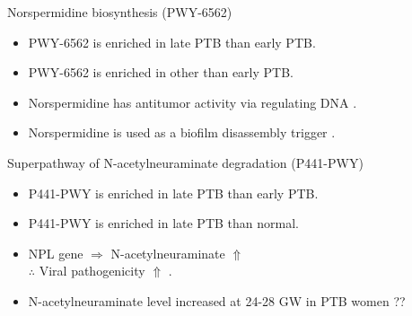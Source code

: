 \documentclass{beamer}
\begin{document}
\begin{frame}[allowframebreaks]
        \begin{block}{Norspermidine biosynthesis (PWY-6562)}
            \begin{itemize}
                \item PWY-6562 is enriched in late PTB than early PTB.
                \item PWY-6562 is enriched in other than early PTB.
                \item Norspermidine has antitumor activity via regulating DNA \cite{PWY-6562-1}.
                \item Norspermidine is used as a biofilm disassembly trigger \cite{PWY-6562-2}.
            \end{itemize}
        \end{block}

        \begin{block}{Superpathway of N-acetylneuraminate degradation (P441-PWY)}
            \begin{itemize}
                \item P441-PWY is enriched in late PTB than early PTB.
                \item P441-PWY is enriched in late PTB than normal.
                \item NPL gene $\Rightarrow$ N-acetylneuraminate $\Uparrow$ \\
                    $\therefore$ Viral pathogenicity $\Uparrow$ \cite{P441-PWY-2}.
                \item N-acetylneuraminate level increased at 24-28 GW in PTB women \cite{P441-PWY-1} ??
            \end{itemize}
        \end{block}
    \end{frame}
\end{document}
